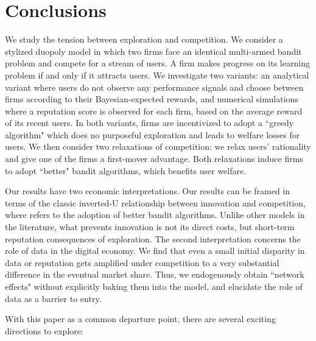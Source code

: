 \documentclass[../competing_bandits.tex]{subfiles}
\begin{document}
\section{Conclusions}\label{sec:conclusion}

We study the tension between exploration and competition. We consider a stylized duopoly model in which two firms face an identical multi-armed bandit problem and compete for a stream of users. A firm makes progress on its learning problem if and only if it attracts users. We investigate two variants: an analytical variant where users do not observe any performance signals and choose between firms according to their Bayesian-expected rewards, and numerical simulations where a reputation score is observed for each firm, based on the average reward of its recent users.  In both variants, firms are incentivized to adopt a ``greedy algorithm" which does no purposeful exploration and leads to welfare losses for users. We then consider two relaxations of competition: we relax users' rationality and give one of the firms a first-mover advantage. Both relaxations induce firms to adopt ``better" bandit algorithms, which benefits user welfare.


Our results have two economic interpretations. Our results can be framed in terms of the classic inverted-U relationship between innovation and competition, where \innovation refers to the adoption of better bandit algorithms. Unlike other models in the literature, what prevents innovation is not its direct costs, but short-term reputation consequences of exploration. The second interpretation concerns the role of data in the digital economy. We find that even a small initial disparity in data or reputation gets amplified under competition to a very substantial difference in the eventual market share. Thus, we endogenously obtain ``network effects" without explicitly baking them into the model, and elucidate the role of data as a barrier to entry.

With this paper as a common departure point, there are several exciting directions to explore:
\end{document}
